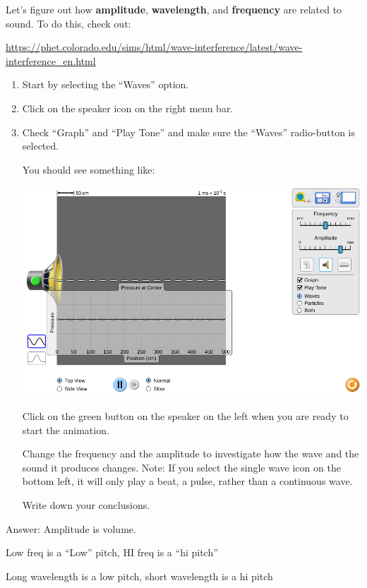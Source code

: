 \documentclass[12pt,noauthor,nooutcomes,hints,handout]{ximera}
\begin{document}
\begin{question}
Let's figure out how \textbf{amplitude}, \textbf{wavelength}, and \textbf{frequency} are related to sound. To do this, check out: 
\begin{center}
     \url{https://phet.colorado.edu/sims/html/wave-interference/latest/wave-interference_en.html}
\end{center}
\begin{enumerate}
\item Start by selecting the ``Waves'' option. 
\item Click on the speaker icon on the right menu bar. 
\item Check ``Graph'' and ``Play Tone'' and make sure the ``Waves'' radio-button is selected.

You should see something like:
\begin{center}
\includegraphics[width=.8\textwidth]{soundGen.png}
\end{center}
Click on the green button on the speaker on the left when you are ready to start the animation.

Change the frequency and the amplitude to investigate how the wave and the sound it produces changes. Note: If you select the single wave icon on the bottom left, it will only play a beat, a pulse, rather than a continuous wave.

Write down your conclusions.

\answerlines


\end{enumerate}
\end{question}

\begin{instructorNotes}
Answer:
Amplitude is volume.

Low freq is a ``Low'' pitch, 
HI freq is a ``hi pitch''

Long wavelength is a low pitch, 
short wavelength is a hi pitch
\end{instructorNotes}
\end{document}
